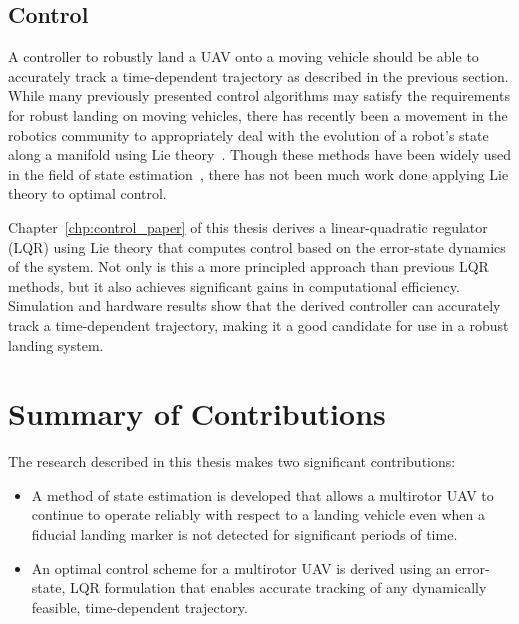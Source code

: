 \subsection{Control}
A controller to robustly land a UAV onto a moving vehicle should be able to
accurately track a time-dependent trajectory as described in the previous section.
While many previously presented control algorithms may satisfy the
requirements for robust landing on moving vehicles, there has recently been a
movement in the robotics community to appropriately deal with the evolution of a
robot's state along a manifold using Lie theory~\cite{sola2018micro}. Though
these methods have been widely used in the field of state
estimation~\cite{sola2017quaternion, koch2017relative}, there has not been much
work done applying Lie theory to optimal control.

Chapter~\ref{chp:control_paper} of this thesis derives a
linear-quadratic regulator (LQR) using Lie theory that computes control based on
the error-state dynamics of the system. Not only is this a more principled
approach than previous LQR methods, but it also achieves significant gains in computational efficiency.
Simulation and hardware results show that the derived controller can accurately
track a time-dependent trajectory, making it a good candidate for use in a
robust landing system.

\section{Summary of Contributions}
The research described in this thesis makes two significant contributions:
\begin{itemize}
\item A method of state estimation is developed that allows a multirotor UAV to
  continue to operate reliably with respect to a landing vehicle even when a
  fiducial landing marker is not detected for significant periods of time.
\item An optimal control scheme for a multirotor UAV is derived using an error-state,
  LQR formulation that enables accurate tracking of any dynamically feasible,
  time-dependent trajectory.
\end{itemize}

